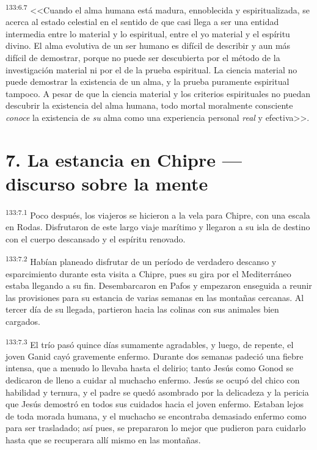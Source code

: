 \par 
\textsuperscript{133:6.7} <<Cuando el alma humana está madura, ennoblecida y espiritualizada, se acerca al estado celestial en el sentido de que casi llega a ser una entidad intermedia entre lo material y lo espiritual, entre el yo material y el espíritu divino. El alma evolutiva de un ser humano es difícil de describir y aun más difícil de demostrar, porque no puede ser descubierta por el método de la investigación material ni por el de la prueba espiritual. La ciencia material no puede demostrar la existencia de un alma, y la prueba puramente espiritual tampoco. A pesar de que la ciencia material y los criterios espirituales no puedan descubrir la existencia del alma humana, todo mortal moralmente consciente \textit{conoce} la existencia de \textit{su} alma como una experiencia personal \textit{real} y efectiva>>.

\section*{7. La estancia en Chipre --- discurso sobre la mente}
\par 
\textsuperscript{133:7.1} Poco después, los viajeros se hicieron a la vela para Chipre, con una escala en Rodas. Disfrutaron de este largo viaje marítimo y llegaron a su isla de destino con el cuerpo descansado y el espíritu renovado.

\par 
\textsuperscript{133:7.2} Habían planeado disfrutar de un período de verdadero descanso y esparcimiento durante esta visita a Chipre, pues su gira por el Mediterráneo estaba llegando a su fin. Desembarcaron en Pafos y empezaron enseguida a reunir las provisiones para su estancia de varias semanas en las montañas cercanas. Al tercer día de su llegada, partieron hacia las colinas con sus animales bien cargados.

\par 
\textsuperscript{133:7.3} El trío pasó quince días sumamente agradables, y luego, de repente, el joven Ganid cayó gravemente enfermo. Durante dos semanas padeció una fiebre intensa, que a menudo lo llevaba hasta el delirio; tanto Jesús como Gonod se dedicaron de lleno a cuidar al muchacho enfermo. Jesús se ocupó del chico con habilidad y ternura, y el padre se quedó asombrado por la delicadeza y la pericia que Jesús demostró en todos sus cuidados hacia el joven enfermo. Estaban lejos de toda morada humana, y el muchacho se encontraba demasiado enfermo como para ser trasladado; así pues, se prepararon lo mejor que pudieron para cuidarlo hasta que se recuperara allí mismo en las montañas.

